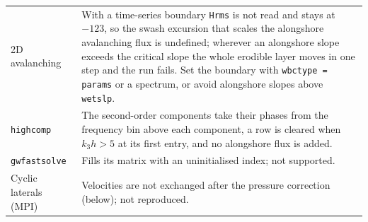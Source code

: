 \documentclass[11pt,a4paper]{article}
\newcommand{\code}[1]{\texttt{#1}}
\begin{document}
\begin{center}
\begin{tabularx}{\textwidth}{lX}
2D avalanching & With a time-series boundary \code{Hrms} is not read and stays at $-123$, so the swash excursion that scales the alongshore avalanching flux is undefined; wherever an alongshore slope exceeds the critical slope the whole erodible layer moves in one step and the run fails. Set the boundary with \code{wbctype = params} or a spectrum, or avoid alongshore slopes above \code{wetslp}. \\
\code{highcomp} & The second-order components take their phases from the frequency bin above each component, a row is cleared when $k_3 h > 5$ at its first entry, and no alongshore flux is added. \\
\code{gwfastsolve} & Fills its matrix with an uninitialised index; not supported. \\
Cyclic laterals (MPI) & Velocities are not exchanged after the pressure correction (below); not reproduced. \\
\bottomrule
\end{tabularx}
\end{center}
\end{document}
